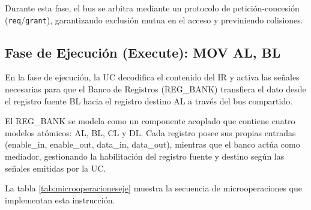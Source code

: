 \documentclass[12pt,oneside]{templates/unerthesis}
\begin{document}
Durante esta fase, el bus se arbitra mediante un protocolo de petición-concesión (\texttt{req}/\texttt{grant}), garantizando exclusión mutua en el acceso y previniendo colisiones.

\hypertarget{fase-de-ejecuciuxf3n-execute-mov-al-bl}{%
\subsection{Fase de Ejecución (Execute): MOV AL, BL}\label{fase-de-ejecuciuxf3n-execute-mov-al-bl}}

En la fase de ejecución, la UC decodifica el contenido del IR y activa las señales necesarias para que el Banco de Registros (REG\_BANK) transfiera el dato desde el registro fuente BL hacia el registro destino AL a través del bus compartido.

El REG\_BANK se modela como un componente acoplado que contiene cuatro modelos atómicos: AL, BL, CL y DL. Cada registro posee sus propias entradas (enable\_in, enable\_out, data\_in, data\_out), mientras que el banco actúa como mediador, gestionando la habilitación del registro fuente y destino según las señales emitidas por la UC.

La tabla \ref{tab:microoperacioneseje} muestra la secuencia de microoperaciones que implementan esta instrucción.
\end{document}
